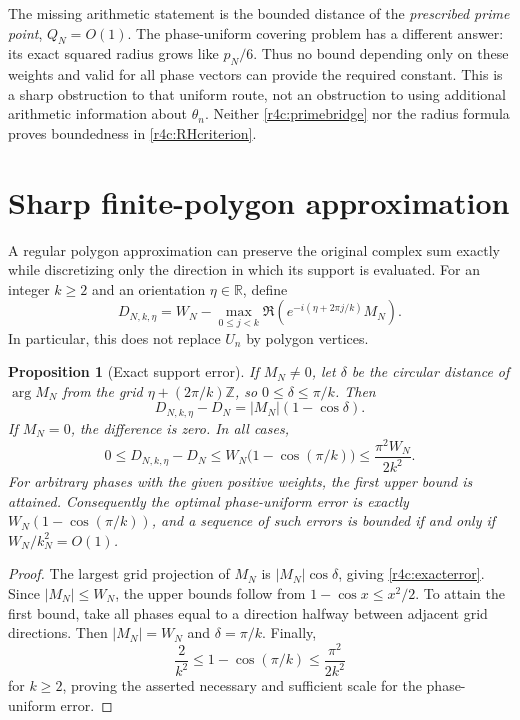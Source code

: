 \documentclass[11pt,a4paper]{article}
\newtheorem{proposition}[theorem]{Proposition}
\theoremstyle{definition}\newtheorem{definition}[theorem]{Definition}
\theoremstyle{remark}\newtheorem{remark}[theorem]{Remark}
\newcommand{\R}{\mathbb R}\newcommand{\Z}{\mathbb Z}
\numberwithin{equation}{section}
\begin{document}
The missing arithmetic statement is the bounded distance of the
\emph{prescribed prime point}, $Q_N=O(1)$.  The phase-uniform
covering problem has a different answer: its exact squared radius
grows like $p_N/6$.  Thus no bound depending only on these weights
and valid for all phase vectors can provide the required constant.
This is a sharp obstruction to that uniform route, not an
obstruction to using additional arithmetic information about
$\theta_n$.  Neither \eqref{r4c:primebridge} nor the radius formula
proves boundedness in \eqref{r4c:RHcriterion}.

\section{Sharp finite-polygon approximation}
\label{r4c:polygon}

A regular polygon approximation can preserve the original complex
sum exactly while discretizing only the direction in which its
support is evaluated.  For an integer $k\geq2$ and an orientation
$\eta\in\R$, define
\begin{equation}\label{r4c:polygondef}
 D_{N,k,\eta}
 =W_N-\max_{0\leq j<k}
     \Re\!\left(e^{-i(\eta+2\pi j/k)}M_N\right).
\end{equation}
In particular, this does not replace $U_n$ by polygon vertices.

\begin{proposition}[Exact support error]\label{r4c:polygonerror}
If $M_N\ne0$, let $\delta$ be the circular distance of $\arg M_N$
from the grid $\eta+(2\pi/k)\Z$, so $0\leq\delta\leq\pi/k$.
Then
\begin{equation}\label{r4c:exacterror}
 D_{N,k,\eta}-D_N=|M_N|(1-\cos\delta).
\end{equation}
If $M_N=0$, the difference is zero.  In all cases,
\begin{equation}\label{r4c:polygonbound}
 0\leq D_{N,k,\eta}-D_N
   \leq W_N\bigl(1-\cos(\pi/k)\bigr)
   \leq\frac{\pi^2W_N}{2k^2}.
\end{equation}
For arbitrary phases with the given positive weights, the first
upper bound is attained.  Consequently the optimal phase-uniform
error is exactly $W_N(1-\cos(\pi/k))$, and a sequence of such errors
is bounded if and only if $W_N/k_N^2=O(1)$.
\end{proposition}

\begin{proof}
The largest grid projection of $M_N$ is $|M_N|\cos\delta$, giving
\eqref{r4c:exacterror}.  Since $|M_N|\leq W_N$, the upper bounds
follow from $1-\cos x\leq x^2/2$.
To attain the first bound, take all phases equal to a direction
halfway between adjacent grid directions.  Then $|M_N|=W_N$ and
$\delta=\pi/k$.  Finally,
\[
 \frac{2}{k^2}\leq1-\cos(\pi/k)
       \leq\frac{\pi^2}{2k^2}
\]
for $k\geq2$, proving the asserted necessary and sufficient scale
for the phase-uniform error.
\end{proof}
\end{document}
